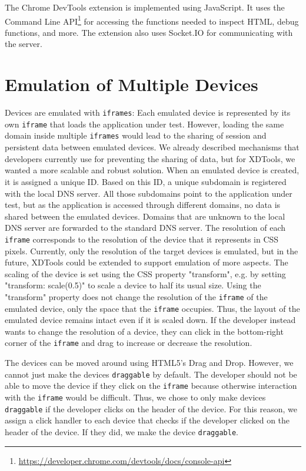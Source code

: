 The Chrome DevTools extension is implemented using JavaScript. It uses the Command Line API\footnote{\url{https://developer.chrome.com/devtools/docs/console-api}} for accessing the functions needed to inspect HTML, debug functions, and more. The extension also uses Socket.IO for  communicating with the server. 

\section{Emulation of Multiple Devices}

Devices are emulated with \lstinline|iframes|: Each emulated device is represented by its own \lstinline|iframe| that loads the application under test. However, loading the same domain inside multiple \lstinline|iframes| would lead to the sharing of session and persistent data between emulated devices. We already described mechanisms that developers currently use for preventing the sharing of data, but for XDTools, we wanted a more scalable and robust solution. When an emulated device is created, it is assigned a unique ID. Based on this ID, a unique subdomain is registered with the local DNS server. All those subdomains point to the application under test, but as the application is accessed through different domains, no data is shared between the emulated devices. Domains that are unknown to the local DNS server are forwarded to the standard DNS server. The resolution of each \lstinline|iframe| corresponds to the resolution of the device that it represents in CSS pixels. Currently, only the resolution of the target devices is emulated, but in the future, XDTools could be extended to support emulation of more aspects. The scaling of the device is set using the CSS property "transform", e.g. by setting "transform: scale(0.5)" to scale a device to half its usual size. Using the "transform" property does not change the resolution of the \lstinline|iframe| of the emulated device, only the space that the \lstinline|iframe| occupies. Thus, the layout of the emulated device remains intact even if it is scaled down. If the developer instead wants to change the resolution of a device, they can click in the bottom-right corner of the \lstinline|iframe| and drag to increase or decrease the resolution. 

The devices can be moved around using HTML5's Drag and Drop. However, we cannot just make the devices \lstinline|draggable| by default. The developer should not be able to move the device if they click on the \lstinline|iframe| because otherwise interaction with the \lstinline|iframe| would be difficult. Thus, we chose to only make devices \lstinline|draggable| if the developer clicks on the header of the device. For this reason, we assign a click handler to each device that checks if the developer clicked on the header of the device. If they did, we make the device \lstinline|draggable|. 

